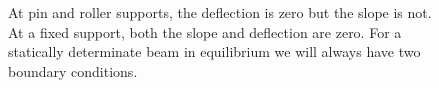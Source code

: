 \documentclass[
  letterpaper,
  DIV=11,
  numbers=noendperiod]{scrreprt}
\begin{document}
\begin{figure}


\caption{\label{fig-11.3}At pin and roller supports, the deflection is
zero but the slope is not. At a fixed support, both the slope and
deflection are zero. For a statically determinate beam in equilibrium we
will always have two boundary conditions.}

\end{figure}%
\end{document}
